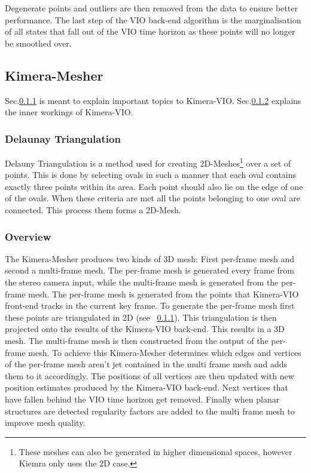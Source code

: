 \documentclass[11pt,a4paper]{article}
\begin{document}
Degenerate points and outliers are then removed from the data to ensure better performance.
The last step of the VIO back-end algorithm is the marginalisation of all states that fall out of the VIO time horizon as these points will no longer be smoothed over.


\subsection{Kimera-Mesher}
Sec.\ref{pre:delaunay} is meant to explain important topics to Kimera-VIO.
Sec.\ref{Sec:K-Mesher overview} explains the inner workings of Kimera-VIO.
\subsubsection{Delaunay Triangulation} \label{pre:delaunay}
Delauny Triangulation is a method used for creating 2D-Meshes\footnote{These meshes can also be generated in higher dimensional spaces, however Kiemra only uses the 2D case.} over a set of points.
This is done by selecting ovals in such a manner that each oval contains exactly three points within its area.
Each point should also lie on the edge of one of the ovals.
When these criteria are met all the points belonging to one oval are connected.
This process them forms a 2D-Mesh.

\subsubsection{Overview} \label{Sec:K-Mesher overview}
The Kimera-Mesher produces two kinds of 3D mesh: 
First per-frame mesh and second a multi-frame mesh.
The per-frame mesh is generated every frame from the stereo camera input, while the multi-frame mesh is generated from the per-frame mesh.
The per-frame mesh is generated from the points that Kimera-VIO front-end tracks in the current key frame. 
To generate the per-frame mesh first these points are triangulated in 2D (see ~\ref{pre:delaunay}).
This triangulation is then projected onto the results of the Kimera-VIO back-end. This results in a 3D mesh. 
The multi-frame mesh is then constructed from the output of the per-frame mesh.
To achieve this Kimera-Mesher determines which edges and vertices of the per-frame mesh aren't jet contained in the multi frame mesh and adds them to it accordingly. 
The positions of all vertices are then updated with new position estimates produced by the Kimera-VIO back-end.
Next vertices that have fallen behind the VIO time horizon get removed. 
Finally when planar structures are detected regularity factors are added to the multi frame mesh to improve mesh quality.
\end{document}
